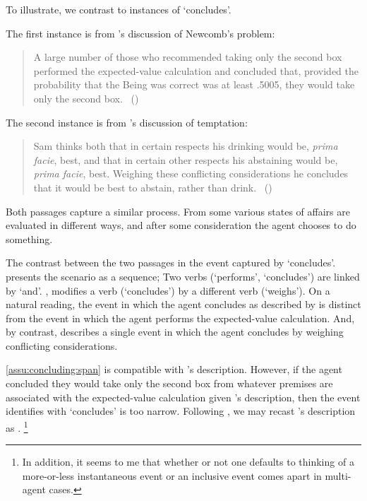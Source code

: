 \begin{note}
  To illustrate, we contrast to instances of `concludes'.

  The first instance is from \citeauthor{Gardner:1986wp}'s discussion of Newcomb's problem:

  \begin{quote}
    A large number of those who recommended taking only the second box performed the expected-value calculation and concluded that, provided the probability that the Being was correct was at least .5005, they would take only the second box.%
    \mbox{ }\hfill\mbox{(\citeyear[166]{Gardner:1986wp})}
  \end{quote}

  The second instance is from \citeauthor{Bratman:1979aa}'s discussion of temptation:

  \begin{quote}
    Sam thinks both that in certain respects his drinking would be, \emph{prima facie}, best, and that in certain other respects his abstaining would be, \emph{prima facie}, best.
    Weighing these conflicting considerations he concludes that it would be best to abstain, rather than drink.%
    \mbox{ }\hfill\mbox{(\citeyear[156]{Bratman:1979aa})}
  \end{quote}

  Both passages capture a similar process.
  From some \agpe{} various states of affairs are evaluated in different ways, and after some consideration the agent chooses to do something.

  The contrast between the two passages in the event captured by `concludes'.
  \citeauthor{Gardner:1986wp} presents the scenario as a sequence;
  Two verbs (`performs', `concludes') are linked by `and'.
  \citeauthor{Bratman:1979aa}, modifies a verb (`concludes') by a different verb (`weighs').
  On a natural reading, the event in which the agent concludes as described by \citeauthor{Gardner:1986wp} is distinct from the event in which the agent performs the expected-value calculation.
  And, by contrast, \citeauthor{Bratman:1979aa} describes a single event in which the agent concludes by weighing conflicting considerations.

  \autoref{assu:concluding:span} is compatible with \citeauthor{Bratman:1979aa}'s description.
  However, if the agent concluded they would take only the second box from whatever premises are associated with the expected-value calculation given \citeauthor{Gardner:1986wp}'s description, then the event \citeauthor{Gardner:1986wp} identifies with `concludes' is too narrow.
  Following \citeauthor{Bratman:1979aa}, we may recast \citeauthor{Gardner:1986wp}'s description as .%
  \footnote{
    In addition, it seems to me that whether or not one defaults to thinking of a more-or-less instantaneous event or an inclusive event comes apart in multi-agent cases.

}
\end{note}
